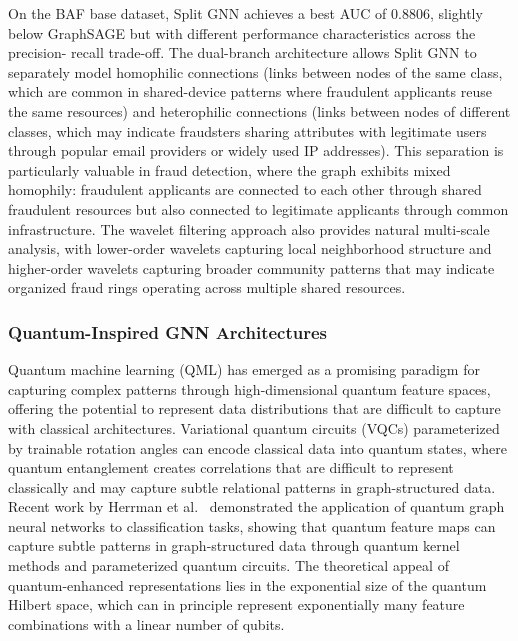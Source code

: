 On the BAF base dataset, Split GNN achieves a best AUC of 0.8806, slightly below
GraphSAGE but with different performance characteristics across the precision-
recall trade-off. The dual-branch architecture allows Split GNN to separately
model homophilic connections (links between nodes of the same class, which are
common in shared-device patterns where fraudulent applicants reuse the same
resources) and heterophilic connections (links between nodes of different
classes, which may indicate fraudsters sharing attributes with legitimate users
through popular email providers or widely used IP addresses). This separation is
particularly valuable in fraud detection, where the graph exhibits mixed
homophily: fraudulent applicants are connected to each other through shared
fraudulent resources but also connected to legitimate applicants through common
infrastructure. The wavelet filtering approach also provides natural multi-scale
analysis, with lower-order wavelets capturing local neighborhood structure and
higher-order wavelets capturing broader community patterns that may indicate
organized fraud rings operating across multiple shared resources.

\subsubsection{Quantum-Inspired GNN Architectures}

Quantum machine learning (QML) has emerged as a promising paradigm for capturing
complex patterns through high-dimensional quantum feature spaces, offering the
potential to represent data distributions that are difficult to capture with
classical architectures. Variational quantum circuits (VQCs) parameterized by
trainable rotation angles can encode classical data into quantum states, where
quantum entanglement creates correlations that are difficult to represent
classically and may capture subtle relational patterns in graph-structured data.
Recent work by Herrman et al.~\cite{herrman2022quantum} demonstrated the
application of quantum graph neural networks to classification tasks, showing
that quantum feature maps can capture subtle patterns in graph-structured data
through quantum kernel methods and parameterized quantum circuits. The
theoretical appeal of quantum-enhanced representations lies in the exponential
size of the quantum Hilbert space, which can in principle represent
exponentially many feature combinations with a linear number of qubits.


